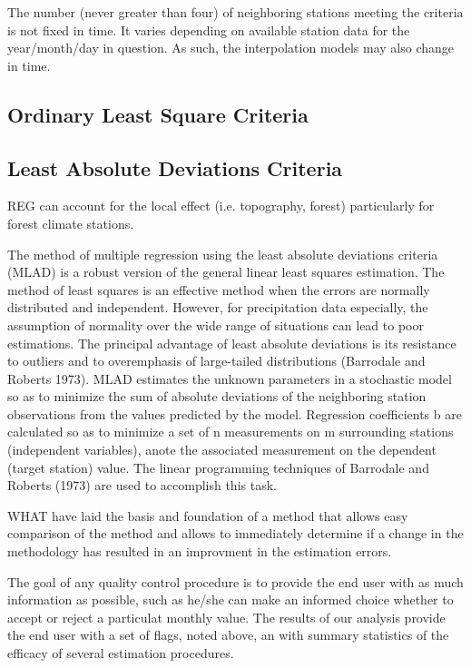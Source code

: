 \documentclass[WHATMANUAL.tex]{subfiles}
\begin{document}
The number (never greater than four) of neighboring stations meeting the criteria is not fixed in time. It varies depending on available station data for the year/month/day in question. As such, the interpolation models may also change in time.

\subsection{Ordinary Least Square Criteria}

\subsection{Least Absolute Deviations Criteria}
REG can account for the local effect (i.e. topography, forest) particularly for forest climate stations.


The method of multiple regression using the least absolute deviations criteria (MLAD) is a robust version
of the general linear least squares estimation. The method of least squares is an effective method when the errors are normally distributed and independent. However, for precipitation data especially, the assumption of normality over the wide range of situations can lead to poor estimations. The principal advantage of least absolute deviations is its resistance to outliers and to overemphasis of large-tailed distributions (Barrodale and Roberts 1973). MLAD estimates the unknown parameters in a stochastic model so as to minimize the sum of absolute deviations of the neighboring station observations from the values predicted by the model. Regression coefficients b are calculated so as to minimize a set of n measurements on m surrounding stations (independent variables), anote the associated measurement on the dependent (target station) value. The linear programming techniques of Barrodale and Roberts (1973) are used to accomplish this task.

WHAT have laid the basis and foundation of a method that allows easy comparison of the method and allows to immediately determine if a change in the methodology has resulted in an improvment in the estimation errors.

The goal of any quality control procedure is to provide the end user with as much information as possible, such as he/she can make an informed choice whether to accept or reject a particulat monthly value. The results of our analysis provide the end user with a set of flags, noted above, an with summary statistics of the efficacy of several estimation procedures.
\end{document}
